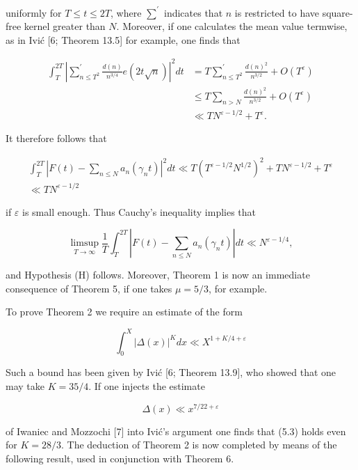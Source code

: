 \documentclass[10pt]{article}
\begin{document}
uniformly for $T \leq t \leq 2 T$, where $\sum^{\prime}$ indicates that $n$ is restricted to have square-free kernel greater than $N$. Moreover, if one calculates the mean value termwise, as in Ivić [6; Theorem 13.5] for example, one finds that

$$
\begin{aligned}
\int_{T}^{2 T}\left|\sum_{n \leq T^{2}}^{\prime} \frac{d(n)}{n^{3 / 4}} e(2 t \sqrt{n})\right|^{2} d t & =T \sum_{n \leq T^{2}}^{\prime} \frac{d(n)^{2}}{n^{3 / 2}}+O\left(T^{\varepsilon}\right) \\
& \leq T \sum_{n>N} \frac{d(n)^{2}}{n^{3 / 2}}+O\left(T^{\varepsilon}\right) \\
& \ll T N^{\varepsilon-1 / 2}+T^{\varepsilon} .
\end{aligned}
$$

It therefore follows that


\begin{gather*}
\int_{T}^{2 T}\left|F(t)-\sum_{n \leq N} a_{n}\left(\gamma_{n} t\right)\right|^{2} d t \ll T\left(T^{\varepsilon-1 / 2} N^{1 / 2}\right)^{2}+T N^{\varepsilon-1 / 2}+T^{\varepsilon}  \tag{5.2}\\
\ll T N^{\varepsilon-1 / 2}
\end{gather*}


if $\varepsilon$ is small enough. Thus Cauchy's inequality implies that

$$
\limsup _{T \rightarrow \infty} \frac{1}{T} \int_{T}^{2 T}\left|F(t)-\sum_{n \leq N} a_{n}\left(\gamma_{n} t\right)\right| d t \ll N^{\varepsilon-1 / 4},
$$

and Hypothesis (H) follows. Moreover, Theorem 1 is now an immediate consequence of Theorem 5, if one takes $\mu=5 / 3$, for example.

To prove Theorem 2 we require an estimate of the form


\begin{equation*}
\int_{0}^{X}|\Delta(x)|^{K} d x \ll X^{1+K / 4+\varepsilon} \tag{5.3}
\end{equation*}


Such a bound has been given by Ivić [6; Theorem 13.9], who showed that one may take $K=35 / 4$. If one injects the estimate

$$
\Delta(x) \ll x^{7 / 22+\varepsilon}
$$

of Iwaniec and Mozzochi [7] into Ivić's argument one finds that (5.3) holds even for $K=28 / 3$. The deduction of Theorem 2 is now completed by means of the following result, used in conjunction with Theorem 6.
\end{document}
